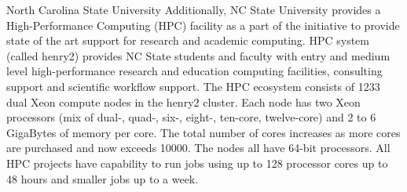 \documentclass{NSF}
\begin{document}
\begin{Facilities}{North Carolina State University}
Additionally, NC State University provides a High-Performance Computing (HPC) facility as a part of the initiative to provide state of the art support for research and academic computing. HPC system (called henry2) provides NC State students and faculty with entry and medium level high-performance research and education computing facilities, consulting support and scientific workflow support. The HPC ecosystem consists of 1233 dual Xeon compute nodes in the henry2 cluster. Each node has two Xeon processors (mix of dual-, quad-, six-, eight-, ten-core, twelve-core) and 2 to 6 GigaBytes of memory per core. The total number of cores increases as more cores are purchased and now exceeds 10000. The nodes all have 64-bit processors. All HPC projects have capability to run jobs using up to 128 processor cores up to 48 hours and smaller jobs up to a week.


\end{Facilities}
\end{document}

